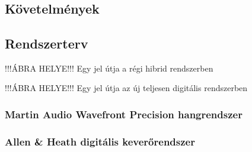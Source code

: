 \chapter{\SystemDesign}

\section{Követelmények}






 

\section{Rendszerterv}








!!!ÁBRA HELYE!!!
Egy jel útja a régi hibrid rendszerben





!!!ÁBRA HELYE!!!
Egy jel útja az új teljesen digitális rendszerben

\subsection{Martin Audio Wavefront Precision hangrendszer}



\subsection{Allen \& Heath digitális keverőrendszer}



